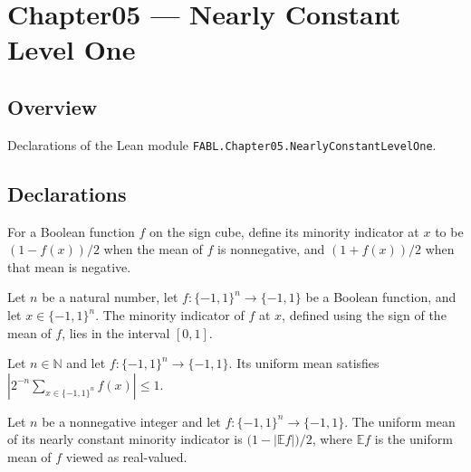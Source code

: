 \chapter{Chapter05 — Nearly Constant Level One}
\section{Overview}

Declarations of the Lean module \texttt{FABL.Chapter05.NearlyConstantLevelOne}.

\section{Declarations}

\begin{definition}
\label{FABL.nearlyConstantMinorityIndicator}
\leanok
{}
For a Boolean function $f$ on the sign cube, define its minority indicator at $x$ to be
$(1-f(x))/2$ when the mean of $f$ is nonnegative, and $(1+f(x))/2$ when that mean is
negative.
\end{definition}

\begin{theorem}
\label{FABL.nearlyConstantMinorityIndicator_mem_Icc}
\leanok
{}
Let $n$ be a natural number, let $f:\{-1,1\}^n\to\{-1,1\}$ be a Boolean function, and
let $x\in\{-1,1\}^n$. The minority indicator of $f$ at $x$, defined using the sign of
the mean of $f$, lies in the interval $[0,1]$.
\end{theorem}

\begin{theorem}
\label{FABL.abs_mean_toReal_le_one}
\leanok
{}
Let $n\in\mathbb N$ and let $f\colon\{-1,1\}^n\to\{-1,1\}$. Its uniform mean satisfies
$|2^{-n}\sum_{x\in\{-1,1\}^n}f(x)|\leq 1$.
\end{theorem}

\begin{theorem}
\label{FABL.mean_nearlyConstantMinorityIndicator}
\leanok
{}
Let $n$ be a nonnegative integer and let $f:\{−1,1\}^n\to\{−1,1\}$. The uniform mean of
its nearly constant minority indicator is $\bigl(1-|\mathbb E f|\bigr)/2$, where
$\mathbb E f$ is the uniform mean of $f$ viewed as real-valued.
\end{theorem}

